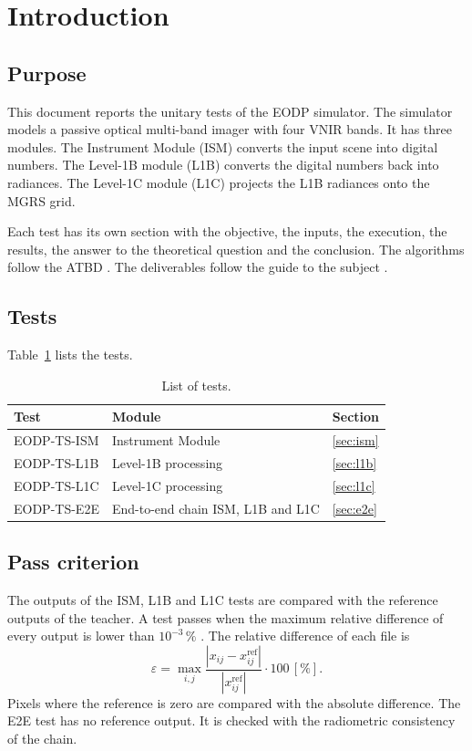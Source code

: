 \section{Introduction}
\label{sec:intro}

\subsection{Purpose}
This document reports the unitary tests of the EODP simulator.
The simulator models a passive optical multi-band imager with four VNIR bands.
It has three modules.
The Instrument Module (ISM) converts the input scene into digital numbers.
The Level-1B module (L1B) converts the digital numbers back into radiances.
The Level-1C module (L1C) projects the L1B radiances onto the MGRS grid.

Each test has its own section with the objective, the inputs, the execution, the results, the answer to the theoretical question and the conclusion.
The algorithms follow the ATBD \cite{atbd}.
The deliverables follow the guide to the subject \cite{guide}.

\subsection{Tests}
Table~\ref{tab:tests} lists the tests.

\begin{table}[H]
\centering
\caption{List of tests.}
\label{tab:tests}
\begin{tabular}{lll}
\toprule
Test & Module & Section \\
\midrule
EODP-TS-ISM & Instrument Module & \ref{sec:ism} \\
EODP-TS-L1B & Level-1B processing & \ref{sec:l1b} \\
EODP-TS-L1C & Level-1C processing & \ref{sec:l1c} \\
EODP-TS-E2E & End-to-end chain ISM, L1B and L1C & \ref{sec:e2e} \\
\bottomrule
\end{tabular}
\end{table}

\subsection{Pass criterion}
The outputs of the ISM, L1B and L1C tests are compared with the reference outputs of the teacher.
A test passes when the maximum relative difference of every output is lower than $10^{-3}\,\%$ \cite{guide}.
The relative difference of each file is
\begin{equation}
\varepsilon = \max_{i,j} \frac{\left| x_{ij} - x^{\mathrm{ref}}_{ij} \right|}{\left| x^{\mathrm{ref}}_{ij} \right|} \cdot 100 \, [\%].
\end{equation}
Pixels where the reference is zero are compared with the absolute difference.
The E2E test has no reference output. It is checked with the radiometric consistency of the chain.

